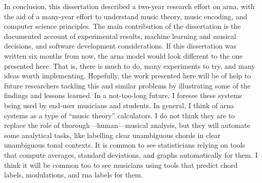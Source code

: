 
In conclusion, this dissertation described a two-year
research effort on \gls{arna}, with the aid of a many-year
effort to understand music theory, music encoding, and
computer science principles. The main contribution of the
dissertation is the documented account of experimental
results, machine learning and musical decisions, and
software development considerations. If this dissertation
was written six months from now, the \gls{arna} model would
look different to the one presented here. That is, there is
much to do, many experiments to try, and many ideas worth
implementing. Hopefully, the work presented here will be of
help to future researchers tackling this and similar
problems by illustrating some of the findings and lessons
learned. In a not-too-long future, I foresee these systems
being used by end-user musicians and students. In general, I
think of \gls{arna} systems as a type of ``music theory''
calculators. I do not think they are to replace the role of
thorough---human---musical analysis, but they will automate
some analytical tasks, like labelling clear unambiguous
chords in clear unambiguous tonal contexts. It is common to
see statisticians relying on tools that compute averages,
standard deviations, and graphs automatically for them. I
think it will be common too to see musicians using tools
that predict chord labels, modulations, and \gls{rna} labels
for them.
